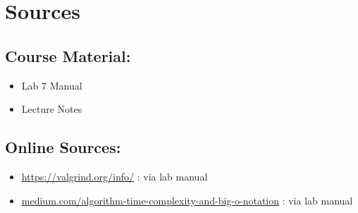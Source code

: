 \documentclass{article}
\begin{document}
\newpage

\section{Sources}

\subsection{Course Material:}
\begin{itemize}
    \item{Lab 7 Manual}
    \item{Lecture Notes}
\end{itemize}

\subsection{Online Sources:}
\begin{itemize}
    \item{\url{https://valgrind.org/info/} : via lab manual}
    \item{\url{medium.com/algorithm-time-complexity-and-big-o-notation} : via lab manual}
\end{itemize}
\end{document}
